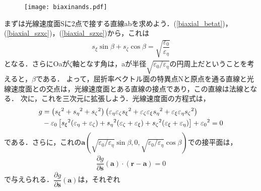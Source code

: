\begin{figure}[ht]
  \centering
  \texttt{[image: biaxinands.pdf]}
  \caption{}
  \label{biaxinands}
\end{figure}

まずは光線速度面Sに2点で接する直線abを求めよう．(\ref{biaxial_betat})，(\ref{biaxial_szxc})，(\ref{biaxial_szxe})から，これは
\begin{align}
  s_\xi\sin\beta+s_\zeta\cos\beta=\sqrt{\dfrac{\varepsilon_0}{\varepsilon_\eta}}
\end{align}
となる．さらにOaが$\zeta$軸となす角は，aが半径$\sqrt{\varepsilon_0/\varepsilon_\eta}$の円周上だということを考えると，$\beta$である．
よって，屈折率ベクトル面の特異点Nと原点を通る直線と光線速度面との交点は，光線速度面とある直線の接点であり，この直線は法線となる．
次に，これを三次元に拡張しよう．光線速度面の方程式は，
\begin{align}
  g & = \left({s_\xi}^2+{s_\eta}^2+{s_\zeta}^2\right)\left(\varepsilon_\eta\varepsilon_\zeta{s_\xi}^2+\varepsilon_\zeta\varepsilon_\xi{s_\eta}^2+\varepsilon_\xi\varepsilon_\eta{s_\zeta}^2\right) \notag \\
  &-{\varepsilon_0}\left[{s_\xi}^2(\varepsilon_\eta+\varepsilon_\zeta)+{s_\eta}^2(\varepsilon_\zeta+\varepsilon_\xi)+{s_\zeta}^2(\varepsilon_\xi+\varepsilon_\eta)\right]
  +{\varepsilon_0}^2=0\label{biaxial_g0}
\end{align}
である．さらに，これの$\boldsymbol{a}(\sqrt{\varepsilon_0/\varepsilon_\eta}\sin\beta,0,\sqrt{\varepsilon_0/\varepsilon_\eta}\cos\beta)$での接平面は，
\begin{align*}
  \dfrac{\partial{g}}{\partial\boldsymbol{s}}(\boldsymbol{a})\cdot(\boldsymbol{r}-\boldsymbol{a})=0
\end{align*}
で与えられる．$\dfrac{\partial{g}}{\partial\boldsymbol{s}}(\boldsymbol{a})$は，それぞれ
